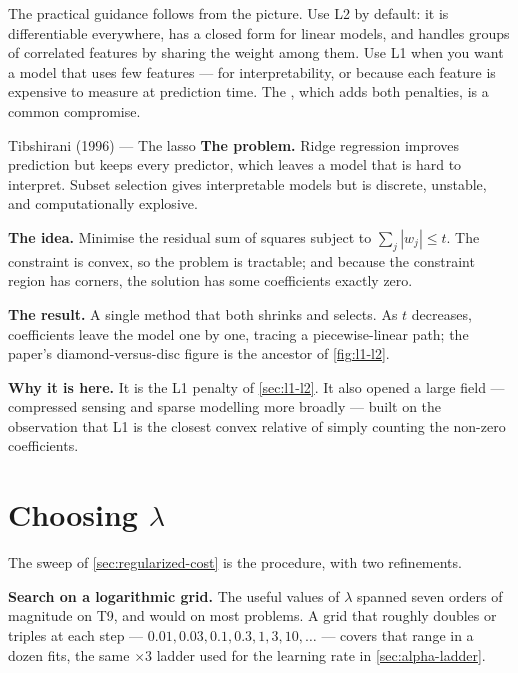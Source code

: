 The practical guidance follows from the picture. Use L2 by default: it is
differentiable everywhere, has a closed form for linear models, and handles
groups of correlated features by sharing the weight among them. Use L1 when you
want a model that uses few features --- for interpretability, or because each
feature is expensive to measure at prediction time. The ,
which adds both penalties, is a common compromise.

\begin{researchspotlight}{Tibshirani (1996) --- The lasso}
\textbf{The problem.} Ridge regression improves prediction but keeps every
predictor, which leaves a model that is hard to interpret. Subset selection
gives interpretable models but is discrete, unstable, and computationally
explosive.

\textbf{The idea.} Minimise the residual sum of squares subject to
$\sum_j|w_j| \le t$. The constraint is convex, so the problem is tractable; and
because the constraint region has corners, the solution has some coefficients
exactly zero.

\textbf{The result.} A single method that both shrinks and selects. As $t$
decreases, coefficients leave the model one by one, tracing a piecewise-linear
path; the paper's diamond-versus-disc figure is the ancestor of
\cref{fig:l1-l2}.

\textbf{Why it is here.} It is the L1 penalty of \cref{sec:l1-l2}. It also
opened a large field --- compressed sensing and sparse modelling more broadly
--- built on the observation that L1 is the closest convex relative of simply
counting the non-zero coefficients.
\parencite{tibshirani1996}
\end{researchspotlight}

\section{Choosing \texorpdfstring{$\lambda$}{lambda}}
\label{sec:choose-lambda}

The sweep of \cref{sec:regularized-cost} is the procedure, with two
refinements.

\textbf{Search on a logarithmic grid.} The useful values of $\lambda$ spanned
seven orders of magnitude on T9, and would on most problems. A grid that roughly
doubles or triples at each step --- $0.01, 0.03, 0.1, 0.3, 1, 3, 10, \dots$ ---
covers that range in a dozen fits, the same $\times3$ ladder used for the
learning rate in \cref{sec:alpha-ladder}.

